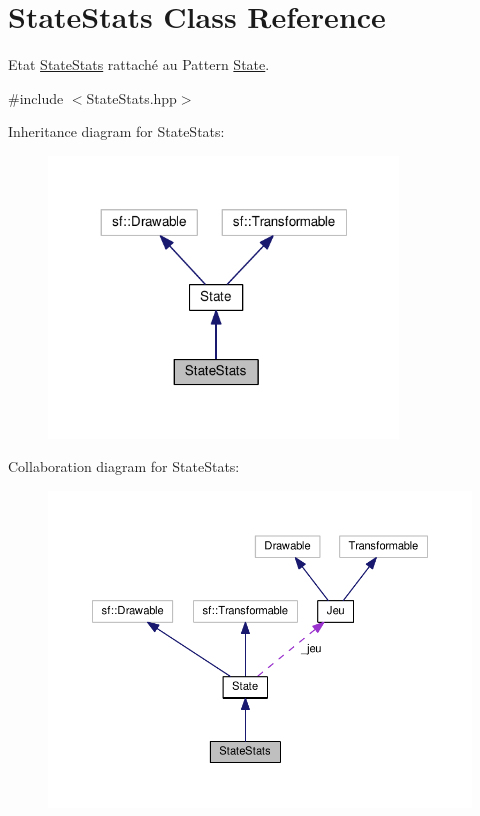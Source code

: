 \hypertarget{class_state_stats}{\section{State\+Stats Class Reference}
\label{class_state_stats}
}


Etat \hyperlink{class_state_stats}{State\+Stats} rattaché au Pattern \hyperlink{class_state}{State}.  




{\ttfamily \#include $<$State\+Stats.\+hpp$>$}



Inheritance diagram for State\+Stats\+:
\nopagebreak
\begin{figure}[H]
\begin{center}
\leavevmode
\includegraphics[width=263pt]{class_state_stats__inherit__graph}
\end{center}
\end{figure}


Collaboration diagram for State\+Stats\+:
\nopagebreak
\begin{figure}[H]
\begin{center}
\leavevmode
\includegraphics[width=350pt]{class_state_stats__coll__graph}
\end{center}
\end{figure}
